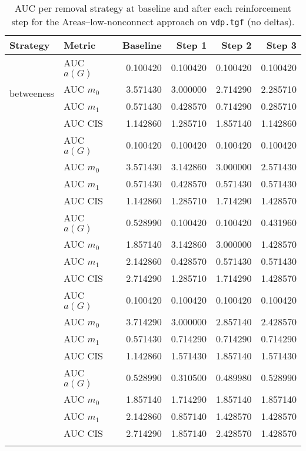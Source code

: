 
\begin{table}[htbp]
  \centering
  \caption{AUC per removal strategy at baseline and after each reinforcement step for the Areas–low-nonconnect approach on \texttt{vdp.tgf} (no deltas).}
  \label{tab:vdp-areas_low_nonconnect-auc}
  \begin{tabular}{llrrrr}
    \toprule
    \textbf{Strategy} & \textbf{Metric} & \textbf{Baseline} & \textbf{Step 1} & \textbf{Step 2} & \textbf{Step 3} \\
    \midrule
    \multirow{4}{*}{betweeness} & AUC $a(G)$ & 0.100420 & 0.100420 & 0.100420 & 0.100420 \\
    & AUC $m_0$ & 3.571430 & 3.000000 & 2.714290 & 2.285710 \\
    & AUC $m_1$ & 0.571430 & 0.428570 & 0.714290 & 0.285710 \\
    & AUC CIS & 1.142860 & 1.285710 & 1.857140 & 1.142860 \\
    \addlinespace
    \multirow{4}{*}{closeness} & AUC $a(G)$ & 0.100420 & 0.100420 & 0.100420 & 0.100420 \\
    & AUC $m_0$ & 3.571430 & 3.142860 & 3.000000 & 2.571430 \\
    & AUC $m_1$ & 0.571430 & 0.428570 & 0.571430 & 0.571430 \\
    & AUC CIS & 1.142860 & 1.285710 & 1.714290 & 1.428570 \\
    \addlinespace
    \multirow{4}{*}{core influence} & AUC $a(G)$ & 0.528990 & 0.100420 & 0.100420 & 0.431960 \\
    & AUC $m_0$ & 1.857140 & 3.142860 & 3.000000 & 1.428570 \\
    & AUC $m_1$ & 2.142860 & 0.428570 & 0.571430 & 0.571430 \\
    & AUC CIS & 2.714290 & 1.285710 & 1.714290 & 1.428570 \\
    \addlinespace
    \multirow{4}{*}{degree} & AUC $a(G)$ & 0.100420 & 0.100420 & 0.100420 & 0.100420 \\
    & AUC $m_0$ & 3.714290 & 3.000000 & 2.857140 & 2.428570 \\
    & AUC $m_1$ & 0.571430 & 0.714290 & 0.714290 & 0.714290 \\
    & AUC CIS & 1.142860 & 1.571430 & 1.857140 & 1.571430 \\
    \addlinespace
    \multirow{4}{*}{random} & AUC $a(G)$ & 0.528990 & 0.310500 & 0.489980 & 0.528990 \\
    & AUC $m_0$ & 1.857140 & 1.714290 & 1.857140 & 1.857140 \\
    & AUC $m_1$ & 2.142860 & 0.857140 & 1.428570 & 1.428570 \\
    & AUC CIS & 2.714290 & 1.857140 & 2.428570 & 1.428570 \\
    \addlinespace
    \bottomrule
  \end{tabular}
\end{table}

